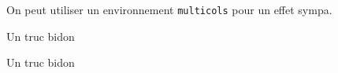 \medskip


On peut utiliser un environnement \verb+multicols+ pour un effet sympa.

\begin{multicols}{2}    
\begin{algo}
    \caption{Un truc bidon}

    \addalgoblank
\end{algo}


\begin{algo}
    \caption{Un truc bidon}

    \addalgoblank
\end{algo}
\end{multicols}


